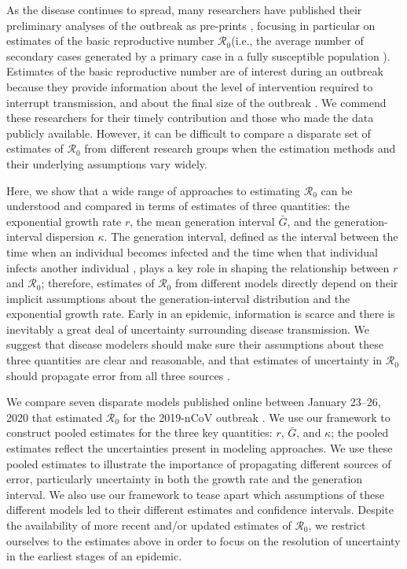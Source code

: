 \documentclass[12pt]{article}
\newcommand{\Ro}{\ensuremath{{\mathcal R}_{0}}\xspace}
\begin{document}
As the disease continues to spread, many researchers have published their preliminary analyses of the outbreak as pre-prints \cite{bedfordncov, imaincov, liuncov, majumderncov, readncov, zhaoncov, riouncov}, focusing in particular on estimates of the basic reproductive number \Ro (i.e., the average number of secondary cases generated by a primary case in a fully susceptible population \cite{anderson1991infectious}).
Estimates of the basic reproductive number are of interest during an outbreak because they provide information about the level of intervention required to interrupt transmission, and about the final size of the outbreak \cite{anderson1991infectious}.
We commend these researchers for their timely contribution and those who made the data publicly available.
However, it can be difficult to compare a disparate set of estimates of \Ro from different research groups when the estimation methods and their underlying assumptions vary widely.

Here, we show that a wide range of approaches to estimating \Ro can be understood and compared in terms of estimates of three quantities: the exponential growth rate $r$, the mean generation interval $\bar G$, and the generation-interval dispersion $\kappa$.
The generation interval, defined as the interval between the time when an individual becomes infected and the time when that individual infects another individual \cite{svensson2007note}, plays a key role in shaping the relationship between $r$ and \Ro \cite{wallinga2007generation};
therefore, estimates of \Ro from different models directly depend on their implicit assumptions about the generation-interval distribution and the exponential growth rate.
Early in an epidemic, information is scarce and there is inevitably a great deal of uncertainty surrounding disease transmission.
We suggest that disease modelers should make sure their assumptions about these three quantities are clear and reasonable, and that estimates of uncertainty in \Ro should propagate error from all three sources \cite{elderd2006uncertainty}.

We compare seven disparate models published online between January 23--26, 2020 that estimated \Ro for the 2019-nCoV outbreak \cite{bedfordncov, imaincov, liuncov, majumderncov, readncov, riouncov, zhaoncov}. 
We use our framework to construct pooled estimates for the three key quantities: $r$, $\bar G$, and $\kappa$;
the pooled estimates reflect the uncertainties present in modeling approaches.
We use these pooled estimates to illustrate the importance of propagating different sources of error, particularly uncertainty in both the growth rate and the generation interval.
We also use our framework to tease apart which assumptions of these different models led to their different estimates and confidence intervals. 
Despite the availability of more recent and/or updated estimates of \Ro, we restrict ourselves to the estimates above in order to focus on the resolution of uncertainty in the earliest stages of an epidemic.
\end{document}
